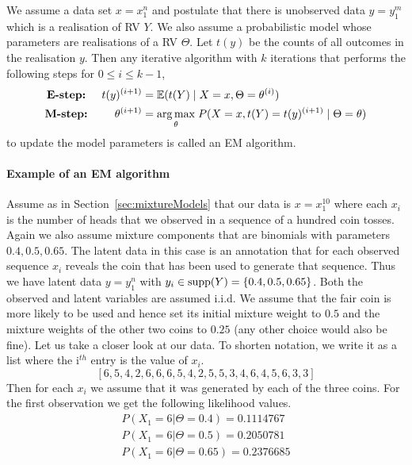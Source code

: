\begin{Definition}[EM algorithm]\label{def:EM}
We assume a data set $ x = x_{1}^{n} $ and postulate that there is unobserved data $ y = y_{1}^{m} $ which
is a realisation of RV $ Y $. We also
assume a probabilistic model whose parameters are realisations of a RV
$ \Theta $. Let $ t(y) $ be the counts of all outcomes in the realisation $ y $. Then any
iterative algorithm with $ k $ iterations that performs the following
steps for $0\leq i \leq k-1$, 
\begin{align*}
\mbox{\textbf{E-step:} } \quad t(y)^{(i+1)} &= \mathbb{E}(t(Y) \mid X = x, \Theta = \theta^{(i)}) \\
\mbox{\textbf{M-step:} } \qquad \theta^{(i+1)} &= \underset{\theta}{\arg\max} \; P(X=x, t(Y) = t(y)^{(i+1)} \mid \Theta = \theta) 
\end{align*}
to update the model parameters is called an EM algorithm. 
\end{Definition}

\paragraph{Example of an EM algorithm} Assume as in Section~\ref{sec:mixtureModels} that our data is $ x=x^{10}_{1} $ where each $ x_{i} $ is the 
number of heads that we observed in a sequence of a hundred coin tosses. Again we also assume mixture components that are binomials with parameters
$ 0.4, 0.5, 0.65 $. The latent data in this case is an annotation that for each observed sequence $ x_{i} $ reveals the coin that has been used
to generate that sequence. Thus we have latent data $ y=y_{1}^{n} $ with $ y_i \in \operatorname{supp}(Y) = \{0.4,0.5,0.65\} $. Both the observed and latent variables
are assumed i.i.d.
We assume that the fair coin is more likely to be used and hence set its initial mixture weight to $ 0.5 $ and the mixture weights of the 
other two coins to $ 0.25 $ (any other choice would also be fine). Let 
us take a closer look at our data. To shorten notation, we write it as a list where the i$ ^{th} $ entry is the value of $ x_{i} $.
$$ [6, 5, 4, 2, 6, 6, 6, 5, 4, 2, 5, 5, 3, 4, 6, 4, 5, 6, 3, 3 ] $$ 
Then for each $ x_{i} $ we assume that it was generated by each of the three coins. For the first observation we get the following likelihood values.
\begin{align}
&P(X_{1}=6|\Theta=0.4) = 0.1114767& \\
&P(X_{1}=6|\Theta=0.5) = 0.2050781& \nonumber \\ 
&P(X_{1}=6|\Theta=0.65) = 0.2376685& \nonumber
\end{align}

